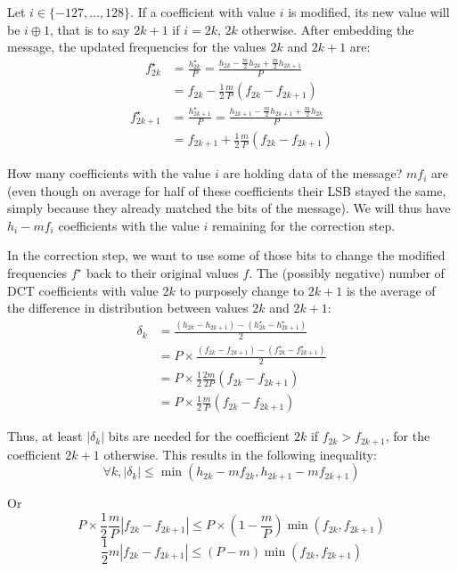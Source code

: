 \documentclass{article}
\begin{document}
Let $i \in \{-127, \ldots, 128\}$. If a coefficient with value $i$ is modified, its new value will be $i \oplus 1$, that is to say $2k + 1$ if $i = 2k$, $2k$ otherwise. After embedding the message, the updated frequencies for the values $2k$ and $2k + 1$ are: \[
	\begin{aligned}
		f_{2k}^\star &= \frac {h_{2k}^\star} P = \frac {h_{2k} - \frac m 2 h_{2k} + \frac m 2 h_{2k + 1}} P \\
		&= f_{2k} - \frac 1 2 \frac m P \left( f_{2k} - f_{2k + 1} \right)		
	\end{aligned}
\]\[
	\begin{aligned}
		f_{2k + 1}^\star &= \frac {h_{2k + 1}^\star} P = \frac {h_{2k + 1} - \frac m 2 h_{2k + 1} + \frac m 2 h_{2k}} P \\
		&= f_{2k + 1} + \frac 1 2 \frac m P \left( f_{2k} - f_{2k + 1} \right)
	\end{aligned}
\]

How many coefficients with the value $i$ are holding data of the message? $m f_i$ are (even though on average for half of these coefficients their LSB stayed the same, simply because they already matched the bits of the message). We will thus have $h_i - m f_i$ coefficients with the value $i$ remaining for the correction step.

In the correction step, we want to use some of those bits to change the modified frequencies $f^\star$ back to their original values $f$. The (possibly negative) number of DCT coefficients with value $2k$ to purposely change to $2k + 1$ is the average of the difference in distribution between values $2k$ and $2k + 1$: \[
	\begin{aligned}
		\delta_k &= \frac {(h_{2k} - h_{2k+1}) - (h^\star_{2k} - h^\star_{2k + 1})} 2	\\
			&= P \times \frac {(f_{2k} - f_{2k+1}) - (f^\star_{2k} - f^\star_{2k + 1})} 2	\\
			&= P \times \frac 1 2 \frac {2m} {2P} \left(f_{2k} - f_{2k + 1}\right) \\
			&= P \times \frac 1 2 \frac m P \left(f_{2k} - f_{2k + 1}\right)
	\end{aligned}
\]

Thus, at least $\left|\delta_k\right|$ bits are needed for the coefficient $2k$ if $f_{2k} > f_{2k + 1}$, for the coefficient $2k + 1$ otherwise. This results in the following inequality: \[
	\forall k, \left|\delta_k\right| \le \min(h_{2k} - m f_{2k}, h_{2k + 1} - m f_{2k + 1})
\]

Or \[
	P \times \frac 1 2 \frac m P \left|f_{2k} - f_{2k + 1}\right| \le P \times \left(1 - \frac m P\right) \min(f_{2k}, f_{2k + 1})
\] \[
	\frac 1 2 m \left|f_{2k} - f_{2k + 1}\right| \le \left(P - m\right) \min(f_{2k}, f_{2k + 1})
\]
\end{document}

